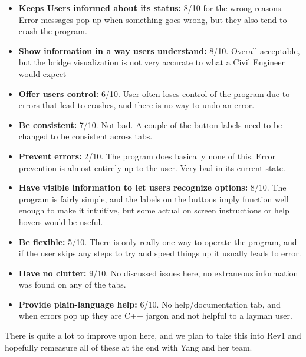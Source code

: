 \documentclass[12pt, titlepage]{article}
\begin{document}
\begin{itemize}
\item \textbf{Keeps Users informed about its status:} 8/10 for the wrong reasons. Error messages pop up when something goes wrong, but they also tend to crash the program.\\
\item \textbf{Show information in a way users understand:} 8/10. Overall acceptable, but the bridge visualization is not very accurate to what a Civil Engineer would expect\\
\item \textbf{Offer users control:} 6/10. User often loses control of the program due to errors that lead to crashes, and there is no way to undo an error.\\
\item \textbf{Be consistent:} 7/10. Not bad. A couple of the button labels need to be changed to be consistent across tabs.\\
\item \textbf{Prevent errors:} 2/10. The program does basically none of this. Error prevention is almost entirely up to the user. Very bad in its current state.\\
\item \textbf{Have visible information to let users recognize options:} 8/10. The program is fairly simple, and the labels on the buttons imply function well enough to make it
intuitive, but some actual on screen instructions or help hovers would be useful.\\
\item \textbf{Be flexible:} 5/10. There is only really one way to operate the program, and if the user skips any steps to try and speed things up it usually leads to error.\\
\item \textbf{Have no clutter:} 9/10. No discussed issues here, no extraneous information was found on any of the tabs.\\
\item \textbf{Provide plain-language help:} 6/10. No help/documentation tab, and when errors pop up they are C++ jargon and not helpful to a layman user.\\
\end{itemize}
There is quite a lot to improve upon here, and we plan to take this into Rev1 and hopefully remeasure all of these at the end with Yang and her team.
\end{document}
